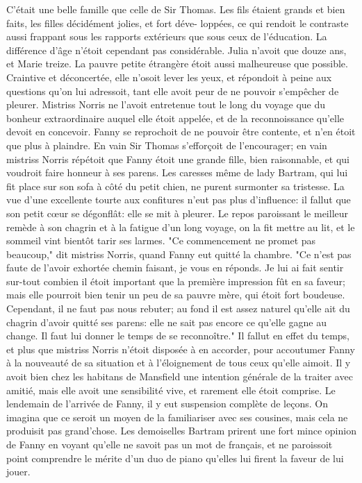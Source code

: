 C'était une belle famille que celle de Sir Thomas. Les fils étaient grands et bien faits, les filles décidément jolies, et fort déve-\setcounter{page}{495} loppées, ce qui rendoit le contraste aussi frappant sous les rapports extérieurs que sous ceux de l'éducation. La différence d'âge n'étoit cependant pas considérable. Julia n'avoit que douze ans, et Marie treize. La pauvre petite étrangère étoit aussi malheureuse que possible. Craintive et déconcertée, elle n'osoit lever les yeux, et répondoit à peine aux questions qu'on lui adressoit, tant elle avoit peur de ne pouvoir s'empêcher de pleurer. Mistriss Norris ne l'avoit entretenue tout le long du voyage que du bonheur extraordinaire auquel elle étoit appelée, et de la reconnoissance qu'elle devoit en concevoir. Fanny se reprochoit de ne pouvoir être contente, et n'en étoit que plus à plaindre. En vain Sir Thomas s'efforçoit de l'encourager; en vain mistriss Norris répétoit que Fanny étoit une grande fille, bien raisonnable, et qui voudroit faire honneur à ses parens. Les caresses même de lady Bartram, qui lui fit place sur son sofa à côté du petit chien, ne purent surmonter sa tristesse. La vue d'une excellente tourte aux confitures n'eut pas plus d'influence: il fallut que son petit cœur se dégonflât: elle se mit à pleurer. Le repos paroissant le meilleur remède à son chagrin et à la fatigue d'un long voyage, on la fit mettre au lit, et le sommeil vint bientôt tarir ses larmes.\setcounter{page}{496} "Ce commencement ne promet pas beaucoup," dit mistriss Norris, quand Fanny eut quitté la chambre. "Ce n’est pas faute de l’avoir exhortée chemin faisant, je vous en réponds. Je lui ai fait sentir sur-tout combien il étoit important que la première impression fût en sa faveur; mais elle pourroit bien tenir un peu de sa pauvre mère, qui étoit fort boudeuse. Cependant, il ne faut pas nous rebuter; au fond il est assez naturel qu’elle ait du chagrin d’avoir quitté ses parens: elle ne sait pas encore ce qu’elle gagne au change. Il faut lui donner le temps de se reconnoître."
Il fallut en effet du temps, et plus que mistriss Norris n’étoit disposée à en accorder, pour accoutumer Fanny à la nouveauté de sa situation et à l’éloignement de tous ceux qu’elle aimoit. Il y avoit bien chez les habitans de Mansfield une intention générale de la traiter avec amitié, mais elle avoit une sensibilité vive, et rarement elle étoit comprise.
Le lendemain de l’arrivée de Fanny, il y eut suspension complète de leçons. On imagina que ce seroit un moyen de la familiariser avec ses cousines, mais cela ne produisit pas grand’chose. Les demoiselles Bartram prirent une fort mince opinion de Fanny en\setcounter{page}{497} voyant qu'elle ne savoit pas un mot de français, et ne paroissoit point comprendre le mérite d'un duo de piano qu'elles lui firent la faveur de lui jouer.
